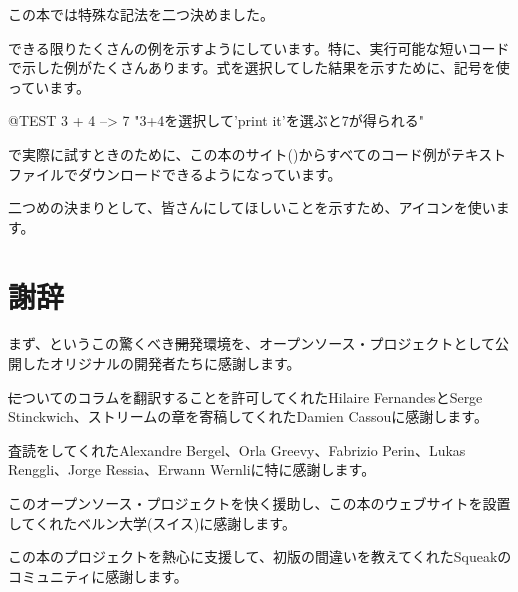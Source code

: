 \documentclass[a4paper,10pt,twoside]{book}
\begin{document}
この本では特殊な記法を二つ決めました。

できる限りたくさんの例を示すようにしています。特に、実行可能な短いコードで示した例がたくさんあります。式を選択してした結果を示すために、\ct{-->}記号を使っています。

\begin{code}{@TEST}
3 + 4 --> 7    "3+4を選択して'print it'を選ぶと7が得られる"
\end{code}

\pharo で実際に試すときのために、この本のサイト(\pbe)からすべてのコード例がテキストファイルでダウンロードできるようになっています。

二つめの決まりとして、皆さんにしてほしいことを示すため、\dothisicon{}アイコンを使います。


\section*{謝辞}

まず、\squeak というこの驚くべき\st 開発環境を、オープンソース・プロジェクトとして公開したオリジナルの開発者たちに感謝します。

\st についてのコラムを翻訳することを許可してくれたHilaire FernandesとSerge Stinckwich、ストリームの章を寄稿してくれたDamien Cassouに感謝します。

査読をしてくれたAlexandre Bergel、Orla Greevy、Fabrizio Perin、Lukas Renggli、Jorge Ressia、Erwann Wernliに特に感謝します。

このオープンソース・プロジェクトを快く援助し、この本のウェブサイトを設置してくれたベルン大学(スイス)に感謝します。

この本のプロジェクトを熱心に支援して、初版の間違いを教えてくれたSqueakのコミュニティに感謝します。

\ifx\wholebook\relax\else
   
   
\end{document}
